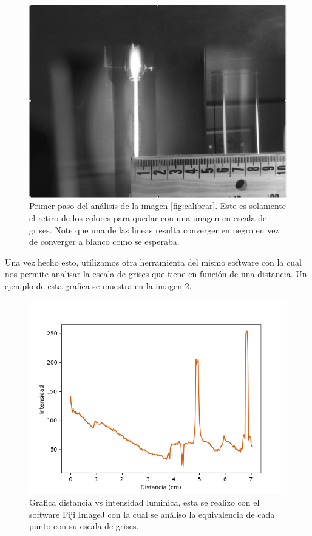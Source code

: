 \documentclass[a4paper, amsfonts, amssymb, amsmath, reprint, showkeys, nofootinbib, twoside]{revtex4-1}
\begin{document}
 \begin{figure}[H]
     \centering
     \includegraphics[scale=0.3]{Graficas/Hidrogeno_BN.png}
     \caption{Primer paso del análisis de la imagen \ref{fig:calibrar}. Este es solamente el retiro de los colores para quedar con una imagen en escala de grises. Note que una de las lineas resulta converger en negro en vez de converger a blanco como se esperaba.}
     \label{fig:CalibrarBN}
 \end{figure}
 Una vez hecho esto, utilizamos otra herramienta del mismo software con la cual nos permite analisar la escala de grises que tiene en función de una distancia. Un ejemplo de esta grafica se muestra en la imagen \ref{fig:Hidrogeno}.
\begin{figure}[H]
    \centering
    \includegraphics[scale=0.5]{Graficas/Hidrogeno.png}
    \caption{Grafica distancia vs intensidad luminica, esta se realizo con el software Fiji ImageJ con la cual se análiso la equivalencia de cada punto con su escala de grises.}
    \label{fig:Hidrogeno}
\end{figure}
\end{document}
